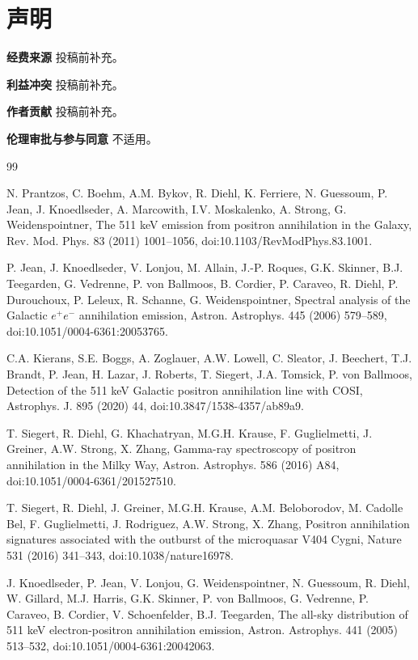 \documentclass[11pt]{article}
\begin{document}
\section*{声明}
\textbf{经费来源} 投稿前补充。

\textbf{利益冲突} 投稿前补充。

\textbf{作者贡献} 投稿前补充。

\textbf{伦理审批与参与同意} 不适用。

\begin{thebibliography}{99}

N. Prantzos, C. Boehm, A.M. Bykov, R. Diehl, K. Ferriere, N. Guessoum, P. Jean, J. Knoedlseder, A. Marcowith, I.V. Moskalenko, A. Strong, G. Weidenspointner, The 511 keV emission from positron annihilation in the Galaxy, Rev. Mod. Phys. 83 (2011) 1001--1056, doi:10.1103/RevModPhys.83.1001.

P. Jean, J. Knoedlseder, V. Lonjou, M. Allain, J.-P. Roques, G.K. Skinner, B.J. Teegarden, G. Vedrenne, P. von Ballmoos, B. Cordier, P. Caraveo, R. Diehl, P. Durouchoux, P. Leleux, R. Schanne, G. Weidenspointner, Spectral analysis of the Galactic $e^+e^-$ annihilation emission, Astron. Astrophys. 445 (2006) 579--589, doi:10.1051/0004-6361:20053765.

C.A. Kierans, S.E. Boggs, A. Zoglauer, A.W. Lowell, C. Sleator, J. Beechert, T.J. Brandt, P. Jean, H. Lazar, J. Roberts, T. Siegert, J.A. Tomsick, P. von Ballmoos, Detection of the 511 keV Galactic positron annihilation line with COSI, Astrophys. J. 895 (2020) 44, doi:10.3847/1538-4357/ab89a9.

T. Siegert, R. Diehl, G. Khachatryan, M.G.H. Krause, F. Guglielmetti, J. Greiner, A.W. Strong, X. Zhang, Gamma-ray spectroscopy of positron annihilation in the Milky Way, Astron. Astrophys. 586 (2016) A84, doi:10.1051/0004-6361/201527510.

T. Siegert, R. Diehl, J. Greiner, M.G.H. Krause, A.M. Beloborodov, M. Cadolle Bel, F. Guglielmetti, J. Rodriguez, A.W. Strong, X. Zhang, Positron annihilation signatures associated with the outburst of the microquasar V404 Cygni, Nature 531 (2016) 341--343, doi:10.1038/nature16978.

J. Knoedlseder, P. Jean, V. Lonjou, G. Weidenspointner, N. Guessoum, R. Diehl, W. Gillard, M.J. Harris, G.K. Skinner, P. von Ballmoos, G. Vedrenne, P. Caraveo, B. Cordier, V. Schoenfelder, B.J. Teegarden, The all-sky distribution of 511 keV electron-positron annihilation emission, Astron. Astrophys. 441 (2005) 513--532, doi:10.1051/0004-6361:20042063.


\end{thebibliography}
\end{document}
